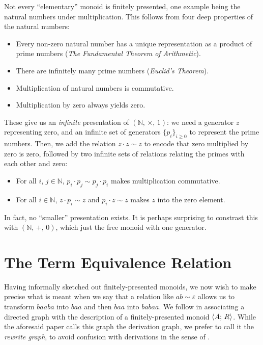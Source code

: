 \documentclass[../generics]{subfiles}
\begin{document}
\begin{example}
Not every ``elementary'' monoid is finitely presented, one example being the natural numbers under multiplication. This follows from four deep properties of the natural numbers:
\begin{itemize}
\item Every non-zero natural number has a unique representation as a product of prime numbers (\emph{The Fundamental Theorem of Arithmetic}).
\item There are infinitely many prime numbers (\emph{Euclid's Theorem}).
\item Multiplication of natural numbers is commutative.
\item Multiplication by zero always yields zero.
\end{itemize}
These give us an \emph{infinite} presentation of $(\mathbb{N},\,\times,\,1)$: we need a generator $z$ representing zero, and an infinite set of generators $\{p_i\}_{i\geq 0}$ to represent the prime numbers. Then, we add the relation $z\cdot z\sim z$ to encode that zero multiplied by zero is zero, followed by two infinite sets of relations relating the primes with each other and zero:
\begin{itemize}
\item For all $i$, $j\in\mathbb{N}$, $p_i\cdot p_j\sim p_j\cdot p_i$ makes multiplication commutative.
\item For all $i\in\mathbb{N}$, $z\cdot p_i\sim z$ and $p_i\cdot z\sim z$ makes $z$ into the zero element.
\end{itemize}
In fact, no ``smaller'' presentation exists. It is perhaps surprising to constrast this with $(\mathbb{N},\,+,\,0)$, which just the free monoid with one generator.
\end{example}

\section{The Term Equivalence Relation}\label{rewrite graph}
Having informally sketched out finitely-presented monoids, we now wish to make precise what is meant when we say that a relation like $ab\sim\varepsilon$ allows us to transform $baaba$ into $baa$ and then $baa$ into $babaa$. We follow \cite{SQUIER1994271} in associating a directed graph with the description of a finitely-presented monoid $\langle A;\,R\rangle$. While the aforesaid paper calls this graph the derivation graph, we prefer to call it the \emph{rewrite graph}, to avoid confusion with derivations in the sense of .
\end{document}

